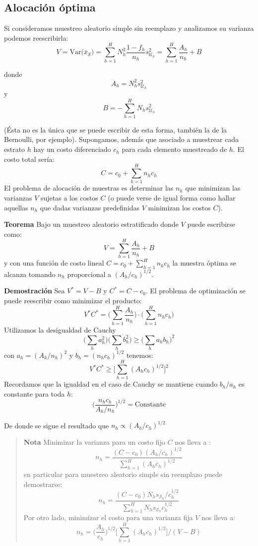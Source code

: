 \documentclass[
]{book}
\begin{document}
\hypertarget{alocaciuxf3n-uxf3ptima}{%
\subsection{Alocación óptima}\label{alocaciuxf3n-uxf3ptima}}

Si consideramos muestreo aleatorio simple sin reemplazo y analizamos su varianza podemos reescribirla:
\[
V = \textrm{Var}\big(\bar{x}_{\mathcal{S}}\big) = \sum\limits_{h = 1}^H N_h^2\dfrac{1 - f_h}{n_h} s^2_{\mathcal{U}_h} = \sum\limits_{h = 1}^H \frac{A_h}{n_h} + B
\]

donde
\[
A_h = N^2_h s^2_{\mathcal{U}_h}
\]
y
\[
B = -\sum\limits_{h = 1}^H N_h s^2_{\mathcal{U}_h}
\]

(Ésta no es la única que se puede escribir de esta forma, también la de la Bernoulli, por ejemplo). Supongamos, además que asociado a muestrear cada estrato \(h\) hay un costo diferenciado \(c_h\) para cada elemento muestreado de \(h\). El costo total sería:
\[
C =c_0 +  \sum\limits_{h = 1}^H n_h c_h
\]
El problema de alocación de muestras es determinar las \(n_h\) que minimizan las varianzas \(V\) sujetas a los costos \(C\) (o puede verse de igual forma como hallar aquellas \(n_h\) que dadas varianzas predefinidas \(V\) minimizan los costos \(C\)).

\textbf{Teorema} Bajo un muestreo aleatorio estratificado donde \(V\) puede escribirse como:
\[
V = \sum\limits_{h = 1}^H \frac{A_h}{n_h} + B
\]
y con una función de costo lineal \(C =c_0 + \sum_{h = 1}^H n_h c_h\) la muestra óptima se alcanza tomando \(n_h\) proporcional a \((A_h/c_h)^{1/2}\).

\textbf{Demostración}
Sea \(V^* = V - B\) y \(C^* = C - c_0\). El problema de optimización se puede reescribir como minimizar el producto:
\[
V^* C^* = \Big( \sum\limits_{h = 1}^H \frac{A_h}{n_h}\Big)\cdot\Big(\sum\limits_{h = 1}^H n_h c_h\Big)
\]
Utilizamos la desigualdad de Cauchy
\[
\big(\sum_h a_h^2\big)\big(\sum_h b_h^2\big) \geq \big(\sum_h a_hb_h\big)^2
\]
con \(a_h = (A_h/n_h)^2\) y \(b_h = (n_h c_h)^{1/2}\) tenemos:
\[
V^* C^* \geq  \Big[ \sum\limits_{h = 1}^H (A_h c_h)^{1/2}\Big]^2
\]
Recordamos que la igualdad en el caso de Cauchy se mantiene cuando \(b_h/a_h\) es constante para toda \(h\):
\[
\Big( \frac{n_h c_h}{A_h/n_h}\Big)^{1/2} = \text{Constante}
\]

De donde se sigue el resultado que \(n_h \propto (A_h/c_h)^{1/2}\)

\begin{quote}
\textbf{Nota} Minimizar la varianza para un costo fijo \(C\) nos lleva a :
\[
n_h = \dfrac{(C - c_0)(A_h/c_h)^{1/2}}{\sum_{h = 1}^H (A_h c_h)^{1/2}}
\]
en particular para muestreo aleatorio simple sin reemplazo puede demostrarse:
\[
n_h = \dfrac{(C - c_0) N_h s_{\mathcal{S}_h} / c_h^{1/2}}{\sum_{h = 1}^H N_h s_{\mathcal{S}_h}  c_h^{1/2} }
\]
Por otro lado, minimizar el costo para una varianza fija \(V\) nos lleva a:
\[
n_h = \Big(\frac{A_h}{c_h}\Big)^{1/2}\Big[ \sum_{h = 1}^H (A_h c_h)^{1/2}\Big] / (V - B)
\]
\end{quote}
\end{document}
